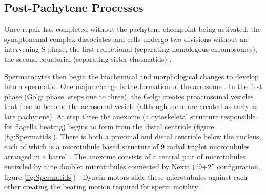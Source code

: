 \subsection{Post-Pachytene Processes}
Once repair has completed without the pachytene checkpoint being activated, the synaptonemal complex dissociates and cells undergo two divisions without an intervening S phase, the first reductional (separating homologous chromosomes), the second equatorial (separating sister chromatids) \parencite{Roeder2000pachytene, Subramanian2014Meiotic, Watanabe2012Geometry}.

Spermatocytes then begin the biochemical and morphological changes to develop into a spermatid. One major change is the formation of the acrosome \parencite[reviewed in][]{Buffone2016Sperm, Khawar2019Mechanism}. In the first phase (Golgi phase, steps one to three), the Golgi creates proacrosomal vesicles that fuse to become the acrosomal vesicle (although some are created as early as late pachytene). At step three the anexome (a cytoskeletal structure responsible for flagella beating) begins to form from the distal centriole (figure \ref{fig:Spermatids}). There is both a proximal and distal centriole below the nucleus, each of which is a microtubule based structure of 9 radial triplet microtubules arranged in a barrel \parencite{Fawcett1969fine, Avidor-Reiss2019It}. The anexome consists of a central pair of microtubules encircled by nine doublet microtubules connected by Nexin (``9+2'' configuration, figure \ref{fig:Spermatids}) \parencite{Linck2016axoneme, Lehti2017Formation}. Dynein motors slide these microtubules against each other creating the beating motion required for sperm motility \parencite{Mitchison2010How}.


